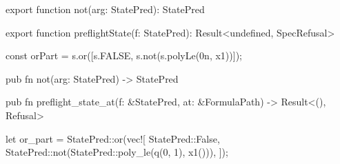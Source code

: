 \begin{tssrc}
export function not(arg: StatePred): StatePred

export function preflightState(f: StatePred): Result<undefined, SpecRefusal>
\end{tssrc}
\begin{tssrc}
const orPart = s.or([s.FALSE, s.not(s.polyLe(0n, x1))]);
\end{tssrc}
\begin{rustsrc}
pub fn not(arg: StatePred) -> StatePred

pub fn preflight_state_at(f: &StatePred, at: &FormulaPath) -> Result<(), Refusal>
\end{rustsrc}
\begin{rustsrc}
let or_part = StatePred::or(vec![
    StatePred::False,
    StatePred::not(StatePred::poly_le(q(0, 1), x1())),
]);
\end{rustsrc}
